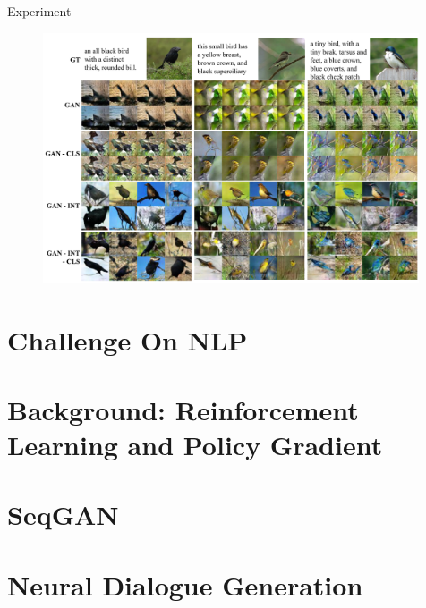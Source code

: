 \documentclass[10pt]{beamer}
\begin{document}
	\begin{frame}{Experiment}
		\begin{figure}
			\includegraphics[width=30em]{figures/image-synthesis-experiment.PNG}
		\end{figure}
	\end{frame}
	
	\part{Challenge On NLP}
	\part{Background: Reinforcement Learning and Policy Gradient}
	\part{SeqGAN}
	\part{Neural Dialogue Generation}
\end{document}
